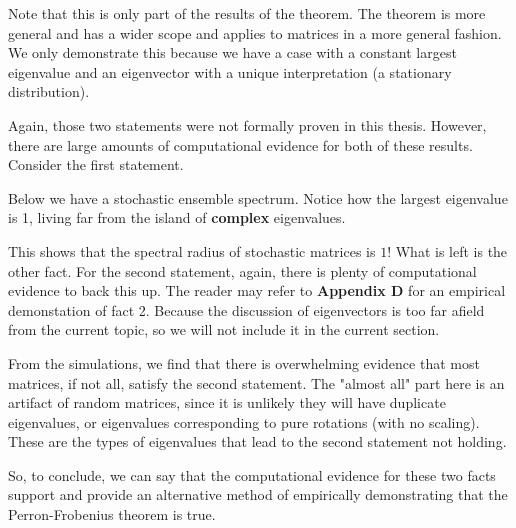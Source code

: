 \begin{note}
  Note that this is only part of the results of the theorem. The theorem is more general and has a wider scope and applies to matrices in a more general fashion.
  We only demonstrate this because we have a case with a constant largest eigenvalue and an eigenvector with a unique interpretation (a stationary distribution).
\end{note}

Again, those two statements were not formally proven in this thesis. However, there are large amounts of computational evidence for both of these results. Consider the first statement.

Below we have a stochastic ensemble spectrum. Notice how the largest eigenvalue is 1, living far from the island of \textbf{complex} eigenvalues.


This shows that the spectral radius of stochastic matrices is $1$! What is left is the other fact.
For the second statement, again, there is plenty of computational evidence to back this up.
The reader may refer to \textbf{Appendix D} for an empirical demonstation of fact 2.
Because the discussion of eigenvectors is too far afield from the current topic, so we will not include it in the current section.

From the simulations, we find that there is overwhelming evidence that most matrices, if not all, satisfy the second statement.
The "almost all" part here is an artifact of random matrices, since it is unlikely they will have duplicate eigenvalues, or eigenvalues corresponding to pure rotations (with no scaling).
These are the types of eigenvalues that lead to the second statement not holding. \newline

 So, to conclude, we can say that the computational evidence for these two facts support and provide an alternative method of empirically demonstrating that the Perron-Frobenius theorem is true.


\newpage

